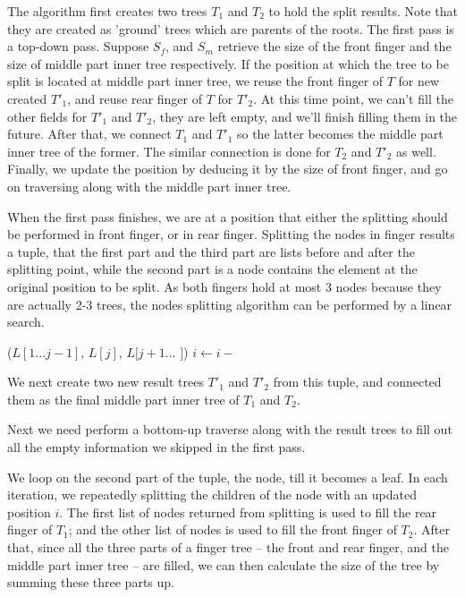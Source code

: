 \documentclass[b5paper]{article}
\begin{document}
The algorithm first creates two trees $T_1$ and $T_2$ to hold the split results. Note that
they are created as 'ground' trees which are parents of the roots. The first pass is
a top-down pass. Suppose $S_f$, and $S_m$ retrieve the size of the front finger and the size of middle part
inner tree respectively. If the position at which the tree to be split is located at middle part inner tree,
we reuse the front finger of $T$ for new created $T'_1$, and reuse rear finger of $T$ for $T'_2$.
At this time point, we can't fill the other fields for $T'_1$ and $T'_2$, they are left empty, and
we'll finish filling them in the future. After that, we connect $T_1$ and $T'_1$ so the latter becomes
the middle part inner tree of the former. The similar connection is done for $T_2$ and $T'_2$ as well.
Finally, we update the position by deducing it by the size of front finger, and go on traversing along
with the middle part inner tree.

When the first pass finishes, we are at a position that either the splitting should be performed
in front finger, or in rear finger. Splitting the nodes in finger results a tuple, that
the first part and the third part are lists before and after the splitting point, while the second
part is a node contains the element at the original position to be split.
As both fingers hold at most 3 nodes because they are actually 2-3 trees, the nodes splitting
algorithm can be performed by a linear search.

\begin{algorithmic}
      \State \Return ($L[1...j-1]$, $L[j]$, $L[j+1...$  $]$)
    \EndIf
    \State $i \gets i -$ 
  \EndFor
\EndFunction
\end{algorithmic}

We next create two new result trees $T'_1$ and $T'_2$ from this tuple, and connected them as the
final middle part inner tree of $T_1$ and $T_2$.

Next we need perform a bottom-up traverse along with the result trees to fill out all the empty
information we skipped in the first pass.

We loop on the second part of the tuple, the node, till it becomes a leaf. In each iteration, we
repeatedly splitting the children of the node with an updated position $i$. The first list of
nodes returned from splitting is used to fill the rear finger of $T_1$; and the other list of
nodes is used to fill the front finger of $T_2$. After that, since all the three parts of a
finger tree -- the front and rear finger, and the middle part inner tree -- are filled, we
can then calculate the size of the tree by summing these three parts up.
\end{document}
